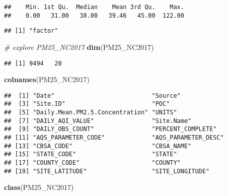 \documentclass[]{article}
\newenvironment{Shaded}{\begin{snugshade}}{\end{snugshade}}
\newcommand{\KeywordTok}[1]{\textcolor[rgb]{0.13,0.29,0.53}{\textbf{#1}}}
\newcommand{\CommentTok}[1]{\textcolor[rgb]{0.56,0.35,0.01}{\textit{#1}}}
\newcommand{\OperatorTok}[1]{\textcolor[rgb]{0.81,0.36,0.00}{\textbf{#1}}}
\newcommand{\NormalTok}[1]{#1}
\begin{document}
\begin{verbatim}
##    Min. 1st Qu.  Median    Mean 3rd Qu.    Max. 
##    0.00   31.00   38.00   39.46   45.00  122.00
\end{verbatim}

\begin{Shaded}
\end{Shaded}

\begin{verbatim}
## [1] "factor"
\end{verbatim}

\begin{Shaded}
\begin{Highlighting}[]
\CommentTok{# explore PM25_NC2017}
\KeywordTok{dim}\NormalTok{(PM25_NC2017)}
\end{Highlighting}
\end{Shaded}

\begin{verbatim}
## [1] 9494   20
\end{verbatim}

\begin{Shaded}
\begin{Highlighting}[]
\KeywordTok{colnames}\NormalTok{(PM25_NC2017)}
\end{Highlighting}
\end{Shaded}

\begin{verbatim}
##  [1] "Date"                           "Source"                        
##  [3] "Site.ID"                        "POC"                           
##  [5] "Daily.Mean.PM2.5.Concentration" "UNITS"                         
##  [7] "DAILY_AQI_VALUE"                "Site.Name"                     
##  [9] "DAILY_OBS_COUNT"                "PERCENT_COMPLETE"              
## [11] "AQS_PARAMETER_CODE"             "AQS_PARAMETER_DESC"            
## [13] "CBSA_CODE"                      "CBSA_NAME"                     
## [15] "STATE_CODE"                     "STATE"                         
## [17] "COUNTY_CODE"                    "COUNTY"                        
## [19] "SITE_LATITUDE"                  "SITE_LONGITUDE"
\end{verbatim}

\begin{Shaded}
\begin{Highlighting}[]
\KeywordTok{class}\NormalTok{(PM25_NC2017)}
\end{Highlighting}
\end{Shaded}
\end{document}
